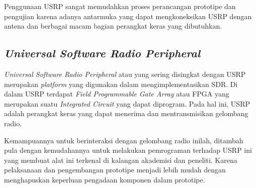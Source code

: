 Penggunaan USRP sangat memudahkan proses perancangan prototipe dan pengujian karena adanya antarmuka yang dapat mengkoneksikan USRP dengan antena dan berbagai macam bagian perangkat keras yang dibutuhkan.

\subsection{\textit{Universal Software Radio Peripheral}}

\textit{Universal Software Radio Peripheral} atau yang sering disingkat dengan USRP merupakan \textit{platform} yang digunakan dalam mengimplementasikan SDR. Di dalam USRP terdapat \textit{Field Programmable Gate Array} atau FPGA yang merupakan suatu \textit{Integrated Circuit} yang dapat diprogram. Pada hal ini, USRP adalah perangkat keras yang dapat menerima dan mentransmisikan gelombang radio.

Kemampuannya untuk berinteraksi dengan gelombang radio inilah, ditambah pula dengan kemudahannya untuk melakukan pemrograman terhadap USRP ini yang membuat alat ini terkenal di kalangan akademisi dan peneliti. Karena pelaksanaan dan pengembangan prototipe menjadi lebih mudah dengan menghapuskan keperluan pengadaan komponen dalam prototipe.

